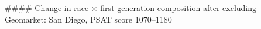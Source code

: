 #### Change in race × first-generation composition after excluding Geomarket: San Diego, PSAT score 1070–1180
